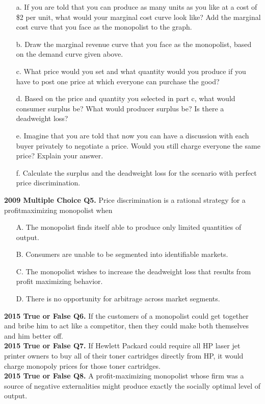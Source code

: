 \documentclass[12pt, xcolor=dvipsnames]{beamer}
\begin{document}
\begin{frame}
\small
\begin{enumerate}\itemsep-0.5ex 
\item[a.] If you are told that you can produce as many units as you like at a cost of \$2 per unit, what would your marginal cost curve look like? Add the marginal cost curve that you face as the monopolist to the graph.
\item[b.] Draw the marginal revenue curve that you face as the monopolist, based on the demand curve given above.
\item[c.] What price would you set and what quantity would you produce if you have to post one price at which everyone can purchase the good?
\item[d.] Based on the price and quantity you selected in part c, what would consumer surplus be? What would producer surplus be? Is there a deadweight loss?
\item[e.] Imagine that you are told that now you can have a discussion with each buyer privately to negotiate a price. Would you still charge everyone the same price? Explain your answer.
\item[f.] Calculate the surplus and the deadweight loss for the scenario with perfect price discrimination.
\end{enumerate}
\end{frame}


\begin{frame}
\textsf{\bfseries 2009 Multiple Choice Q5.} 
Price discrimination is a rational strategy for a profitmaximizing monopolist when
\begin{enumerate}\itemsep-0.5ex 
\item[A.] The monopolist finds itself able to produce only limited quantities of output.
\item[B.] Consumers are unable to be segmented into identifiable markets.
\item[C.] The monopolist wishes to increase the deadweight loss that results from profit maximizing behavior.
\item[D.] There is no opportunity for arbitrage across market segments.
\end{enumerate}
\end{frame}


\begin{frame}
\textsf{\bfseries 2015 True or False Q6.} 
If the customers of a monopolist could get together and bribe him to act like a competitor, then they could make both themselves and him better off.\\[4mm]
\textsf{\bfseries 2015 True or False Q7.} 
If Hewlett Packard could require all HP laser jet printer owners to buy all of their toner cartridges directly from HP, it would charge monopoly prices for those toner cartridges.\\[4mm]
\textsf{\bfseries 2015 True or False Q8.} 
A profit-maximizing monopolist whose firm was a source of negative externalities might produce exactly the socially optimal level of output. 
\end{frame}
\end{document}

